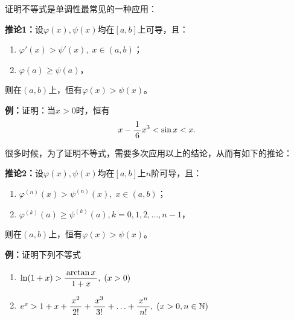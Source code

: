 证明不等式是单调性最常见的一种应用：

\begin{thx}
	{\bf 推论1：}设$\varphi(x),\psi(x) $均在$[a,b]$上可导，且：
	\begin{enumerate}[(1)]
	  \item $\varphi'(x)>\psi'(x),\;x\in(a,b)$；
	  \item $\varphi(a)\geq\psi(a)$，
	\end{enumerate}
	则在$(a,b)$上，恒有$\varphi(x)>\psi(x)$。
\end{thx}

{\bf 例：}证明：当$x>0$时，恒有
$$x-\displaystyle\frac{\,{1}\,}{\,{6}\,}x^3<\sin x<x.$$

\begin{center}
\end{center}

很多时候，为了证明不等式，需要多次应用以上的结论，从而有如下的推论：

\begin{thx}
	{\bf 推论2：}设$\varphi(x),\psi(x) $均在$[a,b]$上$n$阶可导，且：
	\begin{enumerate}[(1)]
	  \item $\varphi^{(n)}(x)>\psi^{(n)}(x),\;x\in(a,b)$；
	  \item $\varphi^{(k)}(a)\geq\psi^{(k)}(a),k=0,1,2,\ldots,n-1$，
	\end{enumerate}
	则在$(a,b)$上，恒有$\varphi(x)>\psi(x)$。
\end{thx}


{\bf 例：}证明下列不等式
\begin{enumerate}[(1)]
  \setlength{\itemindent}{1cm}
  \item $\ln(1+x)>\displaystyle\frac{\,{\arctan x}\,}{\,{1+x}\,},\;(x>0)$
  \item $e^x>1+x+\displaystyle\frac{\,{x^2}\,}{\,{2!}\,}+\displaystyle\frac{\,{x^3}\,}{\,{3!}\,}+\ldots+\displaystyle\frac{\,{x^n}\,}{\,{n!}\,},\;(x>0,n\in\mathbb{N})$
\end{enumerate}


